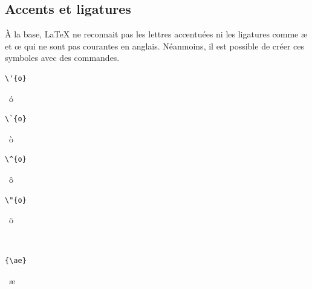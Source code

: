 \subsection{Accents et ligatures}
\label{sec:bases:caracteres:accents}

À la base, {\LaTeX} ne reconnait pas les lettres accentuées ni les
ligatures comme {\ae} et {\oe} qui ne sont pas courantes en anglais.
Néanmoins, il est possible de créer ces symboles avec des commandes.
\begin{demo}
  \begin{minipage}{0.2\linewidth}
    \begin{texample}
\begin{lstlisting}
\'{o}
\end{lstlisting}
      \producing\ \'{o}
    \end{texample}
  \end{minipage}
  \hfill
  \begin{minipage}{0.2\linewidth}
    \begin{texample}
\begin{lstlisting}[escapeinside={}]
\`{o}
\end{lstlisting}
      \producing\ \`{o}
    \end{texample}
  \end{minipage}
  \hfill
  \begin{minipage}{0.2\linewidth}
    \begin{texample}
\begin{lstlisting}
\^{o}
\end{lstlisting}
      \producing\ \^{o}
    \end{texample}
  \end{minipage}
  \hfill
  \begin{minipage}{0.2\linewidth}
    \begin{texample}
\begin{lstlisting}
\"{o}
\end{lstlisting}
      \producing\ \"{o}
    \end{texample}
  \end{minipage} \\
  \hfill
  \begin{minipage}{0.2\linewidth}
    \begin{texample}
\begin{lstlisting}
{\ae}
\end{lstlisting}
      \producing\ \ae
    \end{texample}
  \end{minipage}

\end{demo}
